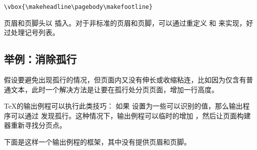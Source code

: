 \documentclass{book}
\begin{document}
\begin{verbatim}
\vbox{\makeheadline\pagebody\makefootline}
\end{verbatim}


页眉和页脚头以  插入。对于非标准的页眉和页脚，可以通过重定义
 和  来实现，好过处理记号列表。


\subsection{举例：消除孤行}

假设要避免出现孤行的情况，但页面内又没有伸长或收缩粘连，比如因为仅含有普通文本，此时一个解决方法是让要在孤行处分页页面，增加一行高度。



\TeX 的输出例程可以执行此类技巧： 如果  设置为一些可以识别的值，那么输出程序可以通过  发现孤行。这种情况下，输出例程可以临时的增加 ，然后让页面构建器重新寻找分页点。


下面是这样一个输出例程的框架，其中没有提供页眉和页脚。
\end{document}
